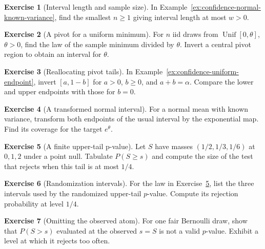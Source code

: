 \documentclass[11pt,oneside]{book}
\theoremstyle{definition}
\newtheorem{exercise}{Exercise}[section]
\theoremstyle{remark}
\begin{document}
\begin{exercise}[Interval length and sample size]
\label{exer:confidence-normal-fixed-width}
In Example~\ref{ex:confidence-normal-known-variance}, find
the smallest $n\geq1$ giving interval length at most $w>0$.
\end{exercise}

\begin{exercise}[A pivot for a uniform minimum]
\label{exer:confidence-uniform-minimum}
For $n$ iid draws from $\operatorname{Unif}[0,\theta]$, $\theta>0$,
find the law of the sample minimum divided by $\theta$. Invert a
central pivot region to obtain an interval for $\theta$.
\end{exercise}

\begin{exercise}[Reallocating pivot tails]
\label{exer:confidence-uniform-pivot-tail-allocation}
In Example~\ref{ex:confidence-uniform-endpoint}, invert
$[a,1-b]$ for $a>0$, $b\geq0$, and $a+b=\alpha$.
Compare the lower and upper endpoints with those for $b=0$.
\end{exercise}

\begin{exercise}[A transformed normal interval]
\label{exer:confidence-normal-exp-transform}
For a normal mean with known variance, transform both
endpoints of the usual interval by the exponential map.
Find its coverage for the target $e^\theta$.
\end{exercise}

\begin{exercise}[A finite upper-tail p-value]
\label{exer:confidence-discrete-tail-table}
Let $S$ have masses $(1/2,1/3,1/6)$ at $0,1,2$ under a
point null. Tabulate $P(S\geq s)$ and compute the size of
the test that rejects when this tail is at most $1/4$.
\end{exercise}

\begin{exercise}[Randomization intervals]
\label{exer:confidence-discrete-randomization-table}
For the law in Exercise~\ref{exer:confidence-discrete-tail-table},
list the three intervals used by the randomized upper-tail
$p$-value. Compute its rejection probability at level $1/4$.
\end{exercise}

\begin{exercise}[Omitting the observed atom]
\label{exer:confidence-strict-tail-invalid}
For one fair Bernoulli draw, show that $P(S>s)$ evaluated
at the observed $s=S$ is not a valid $p$-value. Exhibit a
level at which it rejects too often.
\end{exercise}
\end{document}
